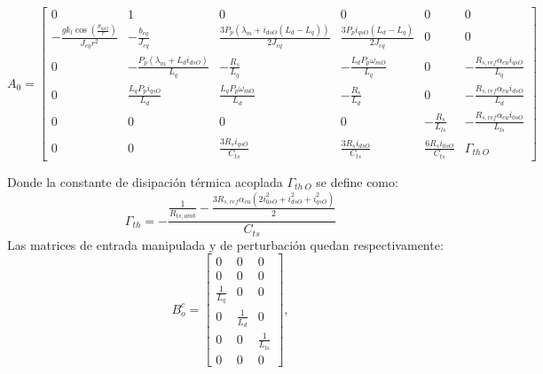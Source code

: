 \documentclass[12pt, a4paper,journal, onecolumn, compsoc]{IEEEtran}
\begin{document}
\begin{equation*}
A_0 = \begin{bmatrix}
0 & 1 & 0 & 0 & 0 & 0 \\
-\frac{g k_l \cos\left(\frac{\theta_{mO}}{r}\right)}{J_{eq} r^2} & -\frac{b_{eq}}{J_{eq}} & \frac{3 P_p (\lambda_m + i_{dsO} (L_d - L_q))}{2 J_{eq}} & \frac{3 P_p i_{qsO} (L_d - L_q)}{2 J_{eq}} & 0 & 0 \\
0 & -\frac{P_p (\lambda_m + L_d i_{dsO})}{L_q} & -\frac{R_s}{L_q} & -\frac{L_d P_p \omega_{mO}}{L_q} & 0 & -\frac{R_{s,ref} \alpha_{cu} i_{qsO}}{L_q} \\
0 & \frac{L_q P_p i_{qsO}}{L_d} & \frac{L_q P_p \omega_{mO}}{L_d} & -\frac{R_s}{L_d} & 0 & -\frac{R_{s,ref} \alpha_{cu} i_{dsO}}{L_d} \\
0 & 0 & 0 & 0 & -\frac{R_s}{L_{ls}} & -\frac{R_{s,ref} \alpha_{cu} i_{0sO}}{L_{ls}} \\
0 & 0 & \frac{3 R_s i_{qsO}}{C_{ts}} & \frac{3 R_s i_{dsO}}{C_{ts}} & \frac{6 R_s i_{0sO}}{C_{ts}} & \Gamma_{th \ O}
\end{bmatrix}
\end{equation*}

Donde la constante de disipación térmica acoplada $\Gamma_{th \ O}$ se define como:
\begin{equation*}
\Gamma_{th} = -\frac{\frac{1}{R_{ts,amb}} - \frac{3 R_{s,ref} \alpha_{cu} (2 i_{0sO}^2 + i_{dsO}^2 + i_{qsO}^2)}{2}}{C_{ts}}
\end{equation*}
Las matrices de entrada manipulada y de perturbación quedan respectivamente:
\begin{equation*}
B_o^c = \begin{bmatrix}
0 & 0 & 0 \\
0 & 0 & 0 \\
\frac{1}{L_q} & 0 & 0 \\
0 & \frac{1}{L_d} & 0 \\
0 & 0 & \frac{1}{L_{ls}} \\
0 & 0 & 0
\end{bmatrix} ,
\end{equation*}
\end{document}
